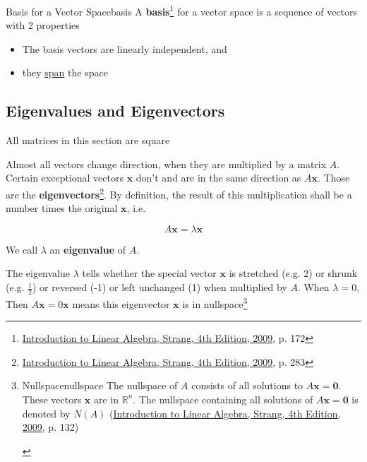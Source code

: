 
\begin{Definition}{Basis for a Vector Space}{basis}
    A \textbf{basis}\footnote{\href{https://trello.com/c/qHJeDNkU}{Introduction to Linear Algebra, Strang, 4th Edition, 2009}, p. 172} for a vector space is a sequence of vectors with 2 properties

    \begin{itemize}
        \item The basis vectors are linearly independent, and
        \item they \hyperlink{span}{span} the space
    \end{itemize}
\end{Definition}

\subsection{Eigenvalues and Eigenvectors}

\begin{tcolorbox}[
    enhanced,arc=3mm,boxrule=1.5mm,
    frame hidden,colback=blue!10!white,
    borderline={1mm}{0mm}{blue,dotted}
]
    \centering
    All matrices in this section are square
\end{tcolorbox}

Almost all vectors change direction, when they are multiplied by a matrix $A$. Certain exceptional vectors
$\boldsymbol{x}$ don't and are in the same direction as $A\boldsymbol{x}$. Those are the \textbf{eigenvectors}\footnote{\href{https://trello.com/c/qHJeDNkU}{Introduction to Linear Algebra, Strang, 4th Edition, 2009}, p. 283}. By definition, the result of this multiplication shall be a number times
the original $\boldsymbol{x}$, i.e.

\begin{equation}
    A\boldsymbol{x} = \lambda\boldsymbol{x}
\end{equation}

We call $\lambda$ an \textbf{eigenvalue} of $A$.

The eigenvalue $\lambda$ tells whether the special vector $\boldsymbol{x}$ is stretched (e.g. 2) or shrunk (e.g.
$\frac{1}{2}$) or reversed (-1) or left unchanged (1) when multiplied by $A$. When $\lambda = 0$, Then
$A\boldsymbol{x} = 0\boldsymbol{x}$ means this eigenvector $\boldsymbol{x}$ is in nullspace\footnote{
\begin{Definition}{Nullspace}{nullspace}
    The nullspace of $A$ consists of all solutions to $A\boldsymbol{x} = \boldsymbol{0}$. These vectors $\boldsymbol{x}$
    are in $\mathbb{R}^n$. The nullspace containing all solutions of $A\boldsymbol{x} = \boldsymbol{0}$ is denoted by
    $N(A)$ (\href{https://trello.com/c/qHJeDNkU}{Introduction to Linear Algebra, Strang, 4th Edition, 2009}, p. 132)
\end{Definition}
}

